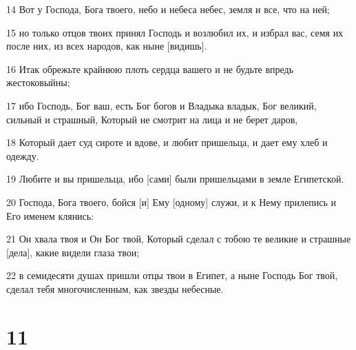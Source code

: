 \par 14 Вот у Господа, Бога твоего, небо и небеса небес, земля и все, что на ней;
\par 15 но только отцов твоих принял Господь и возлюбил их, и избрал вас, семя их после них, из всех народов, как ныне [видишь].
\par 16 Итак обрежьте крайнюю плоть сердца вашего и не будьте впредь жестоковыйны;
\par 17 ибо Господь, Бог ваш, есть Бог богов и Владыка владык, Бог великий, сильный и страшный, Который не смотрит на лица и не берет даров,
\par 18 Который дает суд сироте и вдове, и любит пришельца, и дает ему хлеб и одежду.
\par 19 Любите и вы пришельца, ибо [сами] были пришельцами в земле Египетской.
\par 20 Господа, Бога твоего, бойся [и] Ему [одному] служи, и к Нему прилепись и Его именем клянись:
\par 21 Он хвала твоя и Он Бог твой, Который сделал с тобою те великие и страшные [дела], какие видели глаза твои;
\par 22 в семидесяти душах пришли отцы твои в Египет, а ныне Господь Бог твой, сделал тебя многочисленным, как звезды небесные.

\chapter{11}

